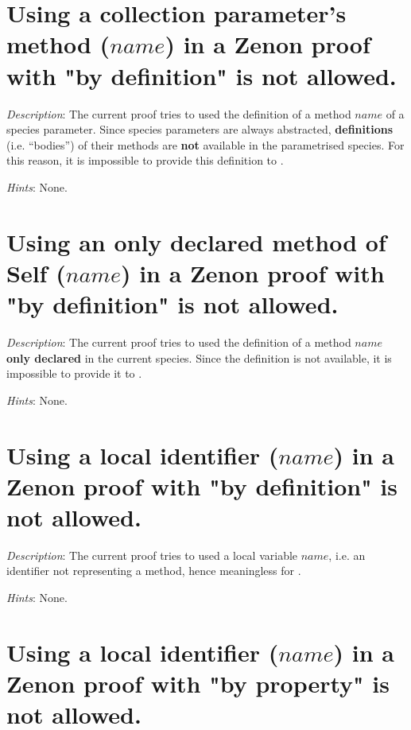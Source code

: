 \section*{Using a collection parameter's method ($name$) in a Zenon proof
  with "by definition" is not allowed.}

{\em Description}: The current proof tries to used the definition of a
method $name$ of a species parameter. Since species parameters are
always abstracted, {\bf definitions} (i.e. ``bodies'') of their methods
are {\bf not} available in the parametrised species. For this reason,
it is impossible to provide this definition to \zenon.

{\em Hints}: None.



\section*{Using an only declared method of Self ($name$) in a Zenon
  proof with "by definition" is not allowed.}

{\em Description}: The current proof tries to used the definition of a
method $name$ {\bf only declared} in the current species. Since the
definition is not available, it is impossible to provide it to
\zenon.

{\em Hints}: None.



\section*{Using a local identifier ($name$) in a Zenon proof with "by
  definition" is not allowed.}

{\em Description}: The current proof tries to used a local variable
$name$, i.e. an identifier not representing a method, hence
meaningless for \zenon.

{\em Hints}: None.



\section*{Using a local identifier ($name$) in a Zenon proof with "by
  property" is not allowed.}

